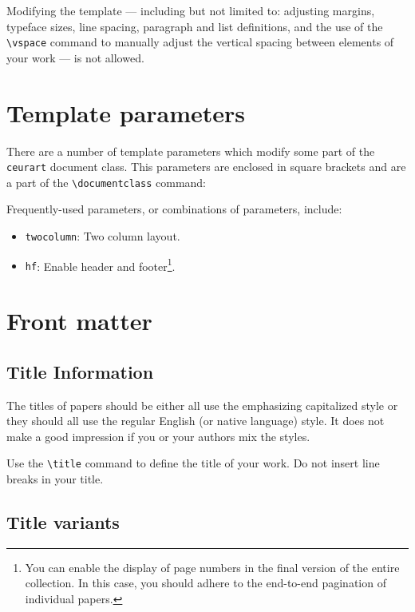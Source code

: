 \documentclass[
]{ceurart}
\begin{document}
Modifying the template --- including but not limited to: adjusting
margins, typeface sizes, line spacing, paragraph and list definitions,
and the use of the \verb|\vspace| command to manually adjust the
vertical spacing between elements of your work --- is not allowed.

\section{Template parameters}

There are a number of template
parameters which modify some part of the \verb|ceurart| document class.
This parameters are enclosed in square
brackets and are a part of the \verb|\documentclass| command:

Frequently-used parameters, or combinations of parameters, include:
\begin{itemize}
\item {\verb|twocolumn|}: Two column layout.
\item {\verb|hf|}: Enable header and footer\footnote{You can enable
    the display of page numbers in the final version of the entire
    collection. In this case, you should adhere to the end-to-end
    pagination of individual papers.}.
\end{itemize}

\section{Front matter}

\subsection{Title Information}

The titles of papers should be either all use the emphasizing
capitalized style or they should all use the regular English (or
native language) style. It does not make a good impression if you or
your authors mix the styles.

Use the \verb|\title| command to define the title of your work. Do not
insert line breaks in your title.

\subsection{Title variants}
\end{document}
